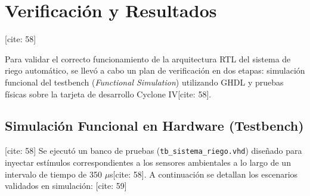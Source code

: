 \section{Verificación y Resultados} [cite: 58]

Para validar el correcto funcionamiento de la arquitectura RTL del sistema de riego automático, se llevó a cabo un plan de verificación en dos etapas: simulación funcional del testbench (\textit{Functional Simulation}) utilizando GHDL y pruebas físicas sobre la tarjeta de desarrollo Cyclone IV[cite: 58].

\subsection{Simulación Funcional en Hardware (Testbench)} [cite: 58]
Se ejecutó un banco de pruebas (\texttt{tb\_sistema\_riego.vhd}) diseñado para inyectar estímulos correspondientes a los sensores ambientales a lo largo de un intervalo de tiempo de 350 $\mu$s[cite: 58]. A continuación se detallan los escenarios validados en simulación: [cite: 59]

